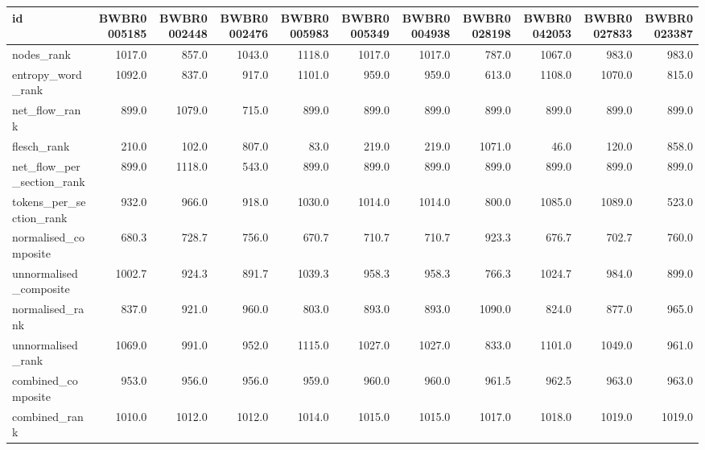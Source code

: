 \begin{tabular}{lrrrrrrrrrr}
\toprule
id & BWBR0005185 & BWBR0002448 & BWBR0002476 & BWBR0005983 & BWBR0005349 & BWBR0004938 & BWBR0028198 & BWBR0042053 & BWBR0027833 & BWBR0023387 \\
\midrule
nodes\_rank & 1017.0 & 857.0 & 1043.0 & 1118.0 & 1017.0 & 1017.0 & 787.0 & 1067.0 & 983.0 & 983.0 \\
\cline{1-11}
entropy\_word\_rank & 1092.0 & 837.0 & 917.0 & 1101.0 & 959.0 & 959.0 & 613.0 & 1108.0 & 1070.0 & 815.0 \\
\cline{1-11}
net\_flow\_rank & 899.0 & 1079.0 & 715.0 & 899.0 & 899.0 & 899.0 & 899.0 & 899.0 & 899.0 & 899.0 \\
\cline{1-11}
flesch\_rank & 210.0 & 102.0 & 807.0 & 83.0 & 219.0 & 219.0 & 1071.0 & 46.0 & 120.0 & 858.0 \\
\cline{1-11}
net\_flow\_per\_section\_rank & 899.0 & 1118.0 & 543.0 & 899.0 & 899.0 & 899.0 & 899.0 & 899.0 & 899.0 & 899.0 \\
\cline{1-11}
tokens\_per\_section\_rank & 932.0 & 966.0 & 918.0 & 1030.0 & 1014.0 & 1014.0 & 800.0 & 1085.0 & 1089.0 & 523.0 \\
\cline{1-11}
normalised\_composite & 680.3 & 728.7 & 756.0 & 670.7 & 710.7 & 710.7 & 923.3 & 676.7 & 702.7 & 760.0 \\
\cline{1-11}
unnormalised\_composite & 1002.7 & 924.3 & 891.7 & 1039.3 & 958.3 & 958.3 & 766.3 & 1024.7 & 984.0 & 899.0 \\
\cline{1-11}
normalised\_rank & 837.0 & 921.0 & 960.0 & 803.0 & 893.0 & 893.0 & 1090.0 & 824.0 & 877.0 & 965.0 \\
\cline{1-11}
unnormalised\_rank & 1069.0 & 991.0 & 952.0 & 1115.0 & 1027.0 & 1027.0 & 833.0 & 1101.0 & 1049.0 & 961.0 \\
\cline{1-11}
combined\_composite & 953.0 & 956.0 & 956.0 & 959.0 & 960.0 & 960.0 & 961.5 & 962.5 & 963.0 & 963.0 \\
\cline{1-11}
combined\_rank & 1010.0 & 1012.0 & 1012.0 & 1014.0 & 1015.0 & 1015.0 & 1017.0 & 1018.0 & 1019.0 & 1019.0 \\
\cline{1-11}
\bottomrule
\end{tabular}
